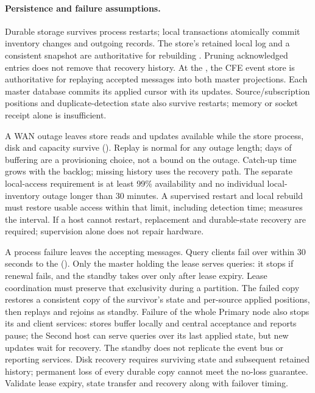 \paragraph{Persistence and failure assumptions.}
Durable storage survives process restarts; local transactions atomically commit
inventory changes and outgoing records. The store's retained local log and a
consistent snapshot are authoritative for rebuilding \StoreLocalInventory.
Pruning acknowledged \Outbox entries does not remove that recovery history.
At the \DC, the CFE event store is authoritative for replaying accepted messages
into both master projections. Each master database commits its applied cursor with
its updates. Source/subscription positions and duplicate-detection state also
survive restarts; memory or socket receipt alone is insufficient.

A WAN outage leaves store reads and updates available while the store process,
disk and capacity survive (). Replay is normal for any outage length;
days of buffering are a provisioning choice, not a bound on the outage. Catch-up
time grows with the backlog; missing history uses the \StoreSnapshot recovery path.
The separate local-access requirement is at least 99\% availability and no
individual local-inventory outage longer than 30 minutes. A supervised restart
and local rebuild must restore usable access within that limit, including
detection time;  measures the interval. If a host cannot restart,
replacement and durable-state recovery are required; supervision alone does not
repair hardware.

A \CentralMasterInventory process failure leaves the \CFE accepting messages.
Query clients fail over within 30 seconds to the \StandbyMaster (). Only
the master holding the lease serves queries: it stops if renewal fails, and the
standby takes over only after lease expiry. Lease coordination must preserve that
exclusivity during a partition. The failed copy restores a consistent copy of the
survivor's state and per-source applied positions, then replays and rejoins as standby.
Failure of the whole Primary \DC node also stops its \CFE and client services:
stores buffer locally and central acceptance and reports pause; the Second \DC host
can serve queries over its last applied state, but new updates wait for \CFE recovery.
The standby does not replicate the event bus or reporting services. Disk recovery
requires surviving state and subsequent retained history; permanent loss of every
durable copy cannot meet the no-loss guarantee. Validate lease expiry, state transfer
and recovery along with failover timing.

